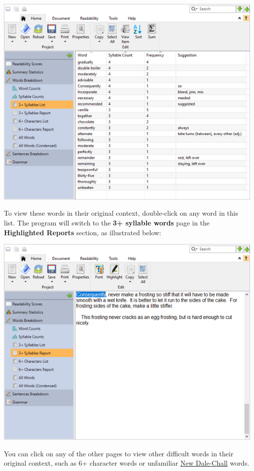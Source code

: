 \documentclass[
]{book}
\theoremstyle{definition}
\theoremstyle{definition}
\theoremstyle{definition}
\theoremstyle{definition}
\theoremstyle{remark}
\begin{document}
\includegraphics{Images/exampledifficultwords.png}

To view these words in their original context, double-click on any word in this list. The program will switch to the \textbf{3+ syllable words} page in the \textbf{Highlighted Reports} section, as illustrated below:

\includegraphics{Images/difficultwordselected.png}

You can click on any of the other pages to view other difficult words in their original context, such as 6+ character words or unfamiliar \protect\hyperlink{dale-chall-test}{New Dale-Chall} words.
\end{document}
